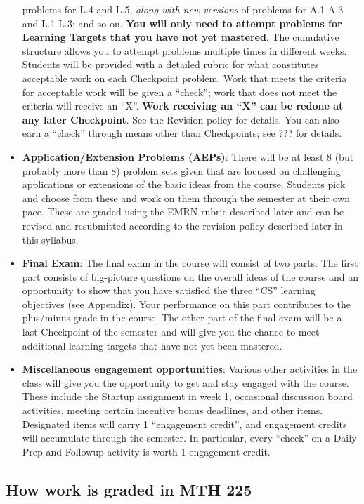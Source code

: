 \documentclass[]{article}
\begin{document}
\begin{itemize}
  problems for L.4 and L.5, \emph{along with new versions} of problems
  for A.1-A.3 and L.1-L.3; and so on. \textbf{You will only need to
  attempt problems for Learning Targets that you have not yet mastered}.
  The cumulative structure allows you to attempt problems multiple times
  in different weeks. Students will be provided with a detailed rubric
  for what constitutes acceptable work on each Checkpoint problem. Work
  that meets the criteria for acceptable work will be given a ``check'';
  work that does not meet the criteria will receive an ``X''.
  \textbf{Work receiving an ``X'' can be redone at any later
  Checkpoint}. See the Revision policy for details. You can also earn a
  ``check'' through means other than Checkpoints; see ??? for details.
\item
  \textbf{Application/Extension Problems (AEPs)}: There will be at least
  8 (but probably more than 8) problem sets given that are focused on
  challenging applications or extensions of the basic ideas from the
  course. Students pick and choose from these and work on them through
  the semester at their own pace. These are graded using the EMRN rubric
  described later and can be revised and resubmitted according to the
  revision policy described later in this syllabus.
\item
  \textbf{Final Exam}: The final exam in the course will consist of two
  parts. The first part consists of big-picture questions on the overall
  ideas of the course and an opportunity to show that you have satisfied
  the three ``CS'' learning objectives (see Appendix). Your performance
  on this part contributes to the plus/minus grade in the course. The
  other part of the final exam will be a last Checkpoint of the semester
  and will give you the chance to meet additional learning targets that
  have not yet been mastered.
\item
  \textbf{Miscellaneous engagement opportunities}: Various other
  activities in the class will give you the opportunity to get and stay
  engaged with the course. These include the Startup assignment in week
  1, occasional discussion board activities, meeting certain incentive
  bonus deadlines, and other items. Designated items will carry 1
  ``engagement credit'', and engagement credits will accumulate through
  the semester. In particular, every ``check'' on a Daily Prep and
  Followup activity is worth 1 engagement credit.
\end{itemize}

\hypertarget{how-work-is-graded-in-mth-225}{%
\subsection{How work is graded in MTH
225}\label{how-work-is-graded-in-mth-225}}
\end{document}
